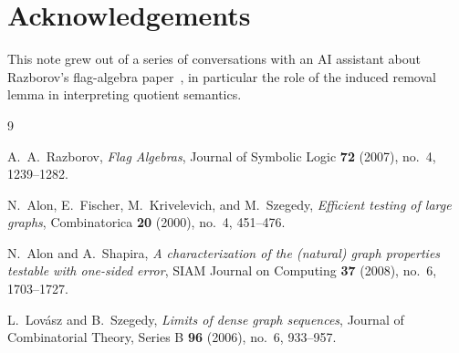\documentclass[11pt]{article}
\theoremstyle{definition}
\begin{document}
\section*{Acknowledgements}

This note grew out of a series of conversations with an AI assistant about
Razborov's flag-algebra paper~\cite{Razborov2007}, in particular the role of
the induced removal lemma in interpreting quotient semantics.

\begin{thebibliography}{9}

A.~A.~Razborov,
\emph{Flag Algebras},
Journal of Symbolic Logic \textbf{72} (2007), no.~4, 1239--1282.

N.~Alon, E.~Fischer, M.~Krivelevich, and M.~Szegedy,
\emph{Efficient testing of large graphs},
Combinatorica \textbf{20} (2000), no.~4, 451--476.

N.~Alon and A.~Shapira,
\emph{A characterization of the (natural) graph properties testable with
one-sided error},
SIAM Journal on Computing \textbf{37} (2008), no.~6, 1703--1727.

L.~Lov\'asz and B.~Szegedy,
\emph{Limits of dense graph sequences},
Journal of Combinatorial Theory, Series B \textbf{96} (2006), no.~6, 933--957.

\end{thebibliography}
\end{document}
